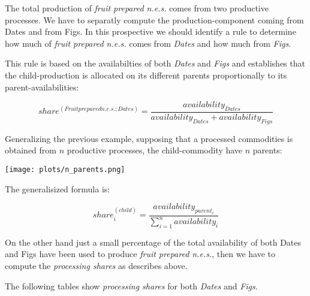 \documentclass[nojss]{jss}
\begin{document}
  The total production of \textit{fruit prepared n.e.s.} comes from two productive processes. We have to separatly compute the production-component  coming from Dates and from Figs. In this prospective we should identify a rule to determine how much of \textit{fruit prepared n.e.s.} comes from \textit{Dates} and how much from \textit{Figs}.
  
This rule is based on the availabilties of both \textit{Dates} and \textit{Figs} and establishes that the child-production is allocated on its  different parents proportionally to its parent-availabilities:


\begin{dmath*}
  share^{(Fruit prepared n.e.s.;Dates)}=\frac{availability_{Dates}}{availability_{Dates}+availability_{Figs}}
 \end{dmath*}


Generalizing the previous example, supposing that a processed commodities is obtained from $n$ productive processes, the child-commodity have $n$ parents:

 \texttt{[image: plots/n\_parents.png]}

The generalisized formula is:

\begin{dmath*}
  share^{(child)}_{i}=\frac{availability_{parent_{i}}}{\sum_{i=1}^{n}availability_{i}}
\end{dmath*}
  
  
  On the other hand just a small percentage of the total availability of both Dates and Figs have been used   to produce \textit{fruit prepared n.e.s.}, then we have to compute the \textit{processing shares} as describes above.
  
  The following tables show \textit{processing shares} for both \textit{Dates} and \textit{Figs}.
  
\end{document}

